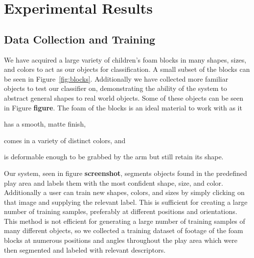 \documentclass[11pt]{article}
\newcommand{\meh}[1]{{\bf \color{blue} #1}}
\begin{document}
\section{Experimental Results}

\subsection{Data Collection and Training}
We have acquired a large variety of children's foam blocks in many shapes, sizes,
and colors to act as our objects for classification. A small subset of the
blocks can be seen in Figure~\ref{fig:blocks}. Additionally we have collected 
more familiar objects to test our classifier on, demonstrating the ability of 
the system to abstract general shapes to real world objects. Some of these 
objects can be seen in Figure \meh{figure}. The foam of the blocks is an
ideal material to work with as it
\begin{inparaenum}[(1)]
\item has a smooth, matte finish,
\item comes in a variety of distinct colors, and
\item is deformable enough to be grabbed by the arm but still retain its
shape.
\end{inparaenum}


Our system, seen in figure \meh{screenshot}, segments objects found in the 
predefined play area and labels them with the most confident shape, size, and 
color.  Additionally a user can train new shapes, colors, and sizes by simply 
clicking on that image and supplying the relevant label.  This is sufficient 
for creating a large number of training samples, preferably at different 
positions and orientations.  This method is not efficient for generating a 
large number of training samples of many different objects, so we collected a 
training dataset of footage of the foam blocks at numerous positions and angles throughout the play area which were then segmented and labeled with relevant 
descriptors.
\end{document}
